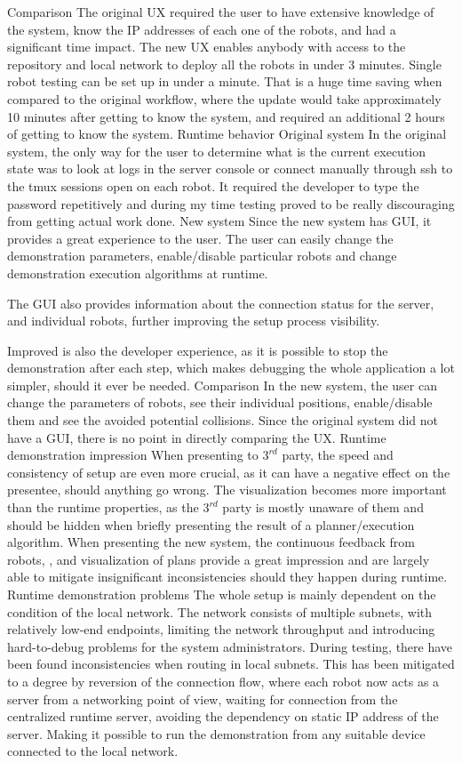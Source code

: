 \secc Comparison
The original UX required the user to have extensive knowledge of the system, know the IP addresses of each one of the robots, and had a significant time impact. The new UX enables anybody with access to the repository and local network to deploy all the robots in under 3 minutes. Single robot testing can be set up in under a minute. That is a huge time saving when compared to the original workflow, where the update would take approximately 10 minutes after getting to know the system, and required an additional 2 hours of getting to know the system.
\sec Runtime behavior
\secc Original system
In the original system, the only way for the user to determine what is the current execution state was to look at logs in the server console or connect manually through ssh to the tmux sessions open on each robot. It required the developer to type the password repetitively and during my time testing proved to be really discouraging from getting actual work done.
\secc New system
Since the new system has GUI, it provides a great experience to the user. The user can easily change the demonstration parameters, enable/disable particular robots and change demonstration execution algorithms at runtime.

The GUI also provides information about the connection status for the server, and individual robots, further improving the setup process visibility.

Improved is also the developer experience, as it is possible to stop the demonstration after each step, which makes debugging the whole application a lot simpler, should it ever be needed.
\secc Comparison
In the new system, the user can change the parameters of robots, see their individual positions, enable/disable them and see the avoided potential collisions. Since the original system did not have a GUI, there is no point in directly comparing the UX. 
\sec Runtime demonstration impression
When presenting to $3^{rd}$ party, the speed and consistency of setup are even more crucial, as it can have a negative effect on the presentee, should anything go wrong. The visualization becomes more important than the runtime properties, as the $3^{rd}$ party is mostly unaware of them and should be hidden when briefly presenting the result of a planner/execution algorithm. When presenting the new system, the continuous feedback from robots, {\vicon}, and visualization of plans provide a great impression and are largely able to mitigate insignificant inconsistencies should they happen during runtime.
\sec Runtime demonstration problems
The whole setup is mainly dependent on the condition of the local network. The network consists of multiple subnets, with relatively low-end endpoints, limiting the network throughput and introducing hard-to-debug problems for the system administrators. During testing, there have been found inconsistencies when routing in local subnets. This has been mitigated to a degree by reversion of the connection flow, where each robot now acts as a server from a networking point of view, waiting for connection from the centralized runtime server, avoiding the dependency on static IP address of the server. Making it possible to run the demonstration from any suitable device connected to the local network.